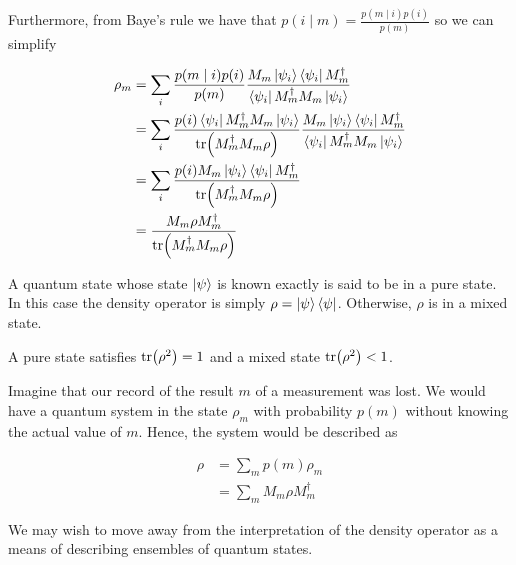 \documentclass[11pt]{article}
\newcommand\0{\mathbf{0}}
\newcommand\<{\langle}
\renewcommand\>{\rangle}
\begin{document}
Furthermore, from Baye's rule we have that $p(i \mid m) = \frac{p(m \mid i)p(i)}{p(m)}$ so we can simplify

\begin{align*}
	\rho_m &= \sum_i \frac{p(m \mid i)p(i)}{p(m)}\frac{M_m \ket{\psi_i}\bra{\psi_i}M_m^\dag}{\bra{\psi_i}M_m^\dag M_m\ket{\psi_i}} \\
	&= \sum_i \frac{p(i)\bra{\psi_i} M_m^\dag M_m \ket{\psi_i}}{\tr(M_m^\dag M_m \rho)}\frac{M_m \ket{\psi_i}\bra{\psi_i}M_m^\dag}{\bra{\psi_i}M_m^\dag M_m\ket{\psi_i}} \\
	&= \sum_i \frac{p(i)M_m \ket{\psi_i}\bra{\psi_i}M_m^\dag}{\tr(M_m^\dag M_m \rho)} \\
	&= \frac{M_m\rho M_m^\dag}{\tr(M_m^\dag M_m \rho)}
\end{align*}

A quantum state whose state $\ket{\psi}$ is known exactly is said to be in a pure state. In this case the density operator is simply $\rho = \ket{\psi}\bra{\psi}$. Otherwise, $\rho$ is in a mixed state.

A pure state satisfies $\tr(\rho^2) = 1$ and a mixed state $\tr(\rho^2) < 1$.

Imagine that our record of the result $m$ of a measurement was lost. We would have a quantum system in the state $\rho_m$ with probability $p(m)$ without knowing the actual value of $m$. Hence, the system would be described as

\begin{align*}
\rho &= \sum_m p(m) \rho_m	\\
&= \sum_m M_m \rho M_m^\dag 
\end{align*}

We may wish to move away from the interpretation of the density operator as a means of describing ensembles of quantum states.
\end{document}

